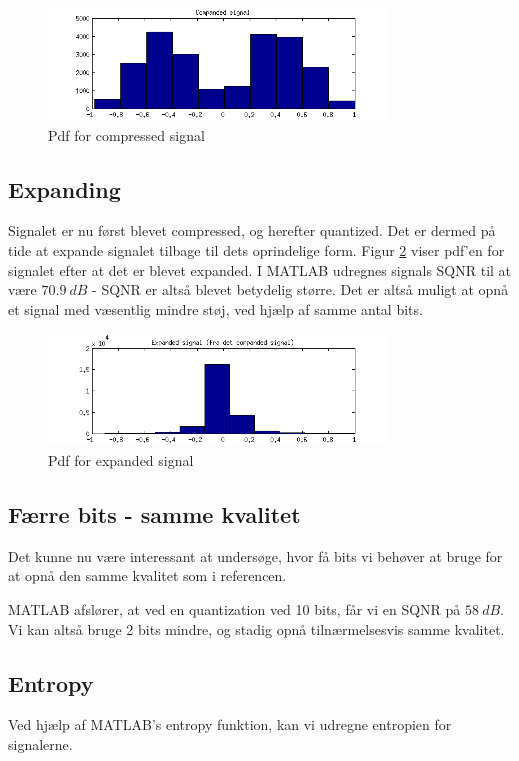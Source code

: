 \begin{figure}[!ht]
	\centering
	\includegraphics[width=0.8\textwidth]{resources/part1_compressed}
 	\caption{Pdf for compressed signal}
 	\label{fig:part1_5}
\end{figure}

\subsection{Expanding}
Signalet er nu først blevet compressed, og herefter quantized. Det er dermed på tide at expande signalet tilbage til dets oprindelige form. Figur \ref{fig:part1_6} viser pdf'en for signalet efter at det er blevet expanded. I MATLAB udregnes signals SQNR til at være $70.9\ dB$ - SQNR er altså blevet betydelig større. Det er altså muligt at opnå et signal med væsentlig mindre støj, ved hjælp af samme antal bits.

\begin{figure}[!ht]
	\centering
	\includegraphics[width=0.8\textwidth]{resources/part1_expanded}
 	\caption{Pdf for expanded signal}
 	\label{fig:part1_6}
\end{figure}

\subsection{Færre bits - samme kvalitet}
Det kunne nu være interessant at undersøge, hvor få bits vi behøver at bruge for at opnå den samme kvalitet som i referencen. 

MATLAB afslører, at ved en quantization ved 10 bits, får vi en SQNR på $58\ dB$. Vi kan altså bruge 2 bits mindre, og stadig opnå tilnærmelsesvis samme kvalitet.

\subsection{Entropy}

Ved hjælp af MATLAB's entropy funktion, kan vi udregne entropien for signalerne.





